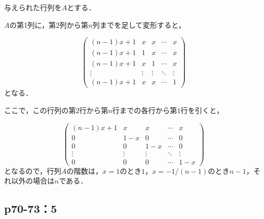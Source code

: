 \documentclass[uplatex,dvipdfmx,a4paper,11pt,fleqn]{jsarticle}
\begin{document}
\begin{leftbar}
    与えられた行列を$A$とする．

    $A$の第1列に，第2列から第$n$列までを足して変形すると，

    \[
        \begin{pmatrix} 
            (n-1)x+1 & x & x&  \cdots & x \\
            (n-1)x+1 & 1 & x & \cdots & x \\
            (n-1)x+1 & x & 1 &  \cdots & x \\
            \vdots & \vdots & \vdots & \ddots & \vdots \\
            (n-1)x+1 & x & x& \cdots & 1 
        \end{pmatrix}
    \]
    となる．

    ここで，この行列の第$2$行から第$n$行までの各行から第$1$行を引くと，

    \[
    \begin{pmatrix} 
        (n-1)x+1 & x & x&  \cdots & x \\
        0 & 1-x & 0 & \cdots & 0 \\
        0  & 0 & 1-x &  \cdots & 0 \\
        \vdots & \vdots & \vdots & \ddots & \vdots \\
        0 & 0 & 0& \cdots & 1 -x 
    \end{pmatrix}
    \]
    となるので，行列$A$の階数は，$x=1$のとき$1$，$ x= -1/(n-1)$のとき$n-1$，それ以外の場合は$n$である．
\end{leftbar}


    \newpage 

    \subsection*{p70-73：5}
    
\end{document}
